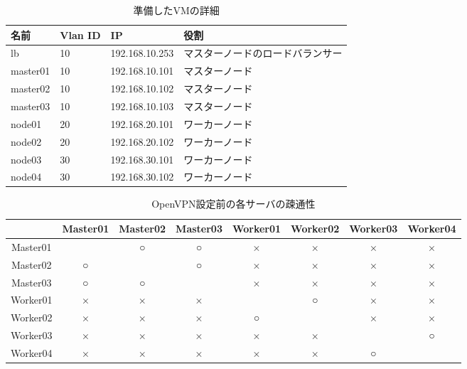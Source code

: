 \begin{table}[htb]
  \begin{center}
    \caption{準備したVMの詳細}
    \begin{tabular}{|l|l|l|l|} \hline
      名前 & Vlan ID & IP & 役割 \\ \hline
      lb & 10 & 192.168.10.253 & マスターノードのロードバランサー \\ \hline
      master01 & 10 & 192.168.10.101 & マスターノード \\ \hline
      master02 & 10 & 192.168.10.102 & マスターノード \\ \hline
      master03 & 10 & 192.168.10.103 & マスターノード \\ \hline
      node01 & 20 & 192.168.20.101 & ワーカーノード \\ \hline
      node02 & 20 & 192.168.20.102 & ワーカーノード \\ \hline
      node03 & 30 & 192.168.30.101 & ワーカーノード \\ \hline
      node04 & 30 & 192.168.30.102 & ワーカーノード \\ \hline
    \end{tabular}
  \end{center}
\end{table}

\begin{table}[htb]
  \begin{center}
    \caption{OpenVPN設定前の各サーバの疎通性}
    \begin{tabular}{|c|c|c|c|c|c|c|c|} \hline
      & Master01 & Master02 & Master03 & Worker01 & Worker02 & Worker03 & Worker04 \\ \hline
      Master01 & \ & ○ & ○ & × & × & × & × \\ \hline
      Master02 & ○ & \ & ○ & × & × & × & × \\ \hline
      Master03 & ○ & ○ & \ & × & × & × & × \\ \hline
      Worker01 & × & × & × & \ & ○ & × & × \\ \hline
      Worker02 & × & × & × & ○ & \ & × & × \\ \hline
      Worker03 & × & × & × & × & × & \ & ○ \\ \hline
      Worker04 & × & × & × & × & × & ○ & \ \\ \hline
    \end{tabular}
  \end{center}
\end{table}

